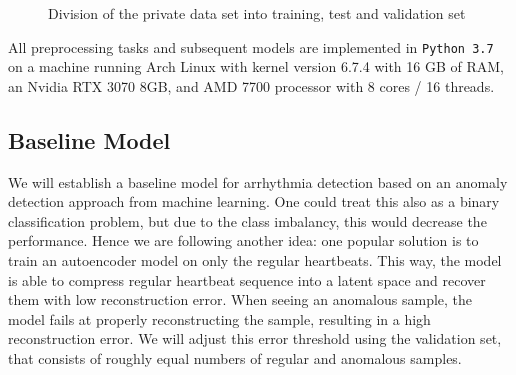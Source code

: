 \begin{figure}[H] \label{fig:tree_test-trainval}
    \centering
    \caption{Division of the private data set into training, test and validation set}
\end{figure}


All preprocessing tasks and subsequent models are implemented in \texttt{Python 3.7} on a machine running Arch Linux with kernel version 6.7.4 with 16 GB of RAM, an Nvidia RTX 3070 8GB, and AMD 7700 processor with 8 cores / 16 threads.

\subsection{Baseline Model}
We will establish a baseline model for arrhythmia detection based on an anomaly detection approach from machine learning. One could treat this also as a binary classification problem, but due to the class imbalancy, this would decrease the performance. Hence we are following another idea: one popular solution is to train an autoencoder model on only the regular heartbeats. This way, the model is able to compress regular heartbeat sequence into a latent space and recover them with low reconstruction error. When seeing an anomalous sample, the model fails at properly reconstructing the sample, resulting in a high reconstruction error. We will adjust this error threshold using the validation set, that consists of roughly equal numbers of regular and anomalous samples.

